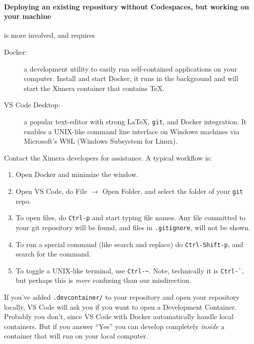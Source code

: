\documentclass{ximera}
\begin{document}
\paragraph{Deploying an existing repository without Codespaces, but working on your machine} is more involved, and requires
\begin{description}
    \item[Docker:] a development utility to easily run
        self-contained applications on your
        computer. Install and start Docker, it runs in the background and will start the Ximera container that contains TeX.
    \item[VS Code Desktop:] a popular text-editor with strong \LaTeX, \verb!git!,
        and Docker integration. It enables a UNIX-like command line interface on
        Windows machines via Microsoft's WSL (Windows Subsystem for Linux).
\end{description}
Contact the Ximera developers for assistance. A typical workflow is:
\begin{enumerate}
    \item Open Docker and minimize the window.
    \item Open VS Code, do File $\to$ Open Folder, and select the
          folder of your \verb!git! repo.
    \item To open files, do \verb!Ctrl-p! and start typing file names. Any
          file
          committed to your git repository will be found, and files in
          \verb!.gitignore!, will not be shown.
    \item To run a special command (like search and replace) do
          \verb!Ctrl-Shift-p!, and search for the command.
    \item To toggle a UNIX-like terminal, use \verb!Ctrl-~!. Note, technically
          it is \verb!Ctrl-`!, but perhaps this is \textit{more} confusing than our
          misdirection.
\end{enumerate}

\begin{warning}
    If you've added \verb!.devcontainer/! to your repository and open your repository
    locally, VS Code will ask you if you want to open a Development Container.
    Probably you don't, since VS Code with Docker automatically handle local containers.
    But if you answer ``Yes'' you can develop completely \textit{inside} a container that will run on your local computer. 
\end{warning}
\end{document}
